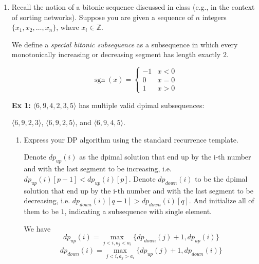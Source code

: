 \documentclass[12pt,a4paper]{article}
\theoremstyle{definition}
\begin{document}
\begin{enumerate}
    \item {\color{purple}{(Longest Special Bitonic Subsequence)}}
    
    Recall the notion of a bitonic sequence discussed in class (e.g., in the context of sorting networks). Suppose you are given a sequence of $n$ integers $\{x_1, x_2, \dots, x_n\}$, where $x_i \in \mathbb{Z}$.
    
    We define a \textit{special bitonic subsequence} as a subsequence in which every monotonically increasing or decreasing segment has length exactly $2$.
    
    \begin{minipage}{0.4\textwidth}
        \[
            \operatorname{sgn}(x) =
            \begin{cases}
            -1 & x < 0 \\
            0 & x = 0 \\
            1 & x > 0
            \end{cases}
        \]
    \end{minipage}
    \hfill
    \begin{minipage}{0.55\textwidth}
        \textbf{Ex 1:} $\langle 6, 9, 4, 2, 3, 5 \rangle$ has multiple valid dpimal subsequences:
        
        $\langle 6, 9, 2, 3 \rangle$, $\langle 6, 9, 2, 5 \rangle$, and $\langle 6, 9, 4, 5 \rangle$.
    \end{minipage}

    \begin{enumerate}
        \item Express your DP algorithm using the standard recurrence template. 

        Denote $dp_{up}(i)$ as the dpimal solution that end up by the i-th number and with the last segment to be increasing, i.e. $dp_{up}(i)[p-1] < dp_{up}(i)[p]$.
        Denote $dp_{down}(i)$ to be the dpimal solution that end up by the i-th number and with the last segment to be decreasing, i.e. $dp_{down}(i)[q-1] > dp_{down}(i)[q]$. And initialize all of them to be $1$, indicating a subsequence with single element.

        We have 
        \[
        dp_{up}(i) = \mathop{max}\limits_{j<i, a_j < a_i}\{dp_{down}(j)+1, dp_{up}(i)\}
        \]
        \[dp_{down}(i) = \mathop{max}\limits_{j<i, a_j > a_i}\{dp_{up}(j)+1, dp_{down}(i)\}\]
        

\end{enumerate}
\end{enumerate}
\end{document}
